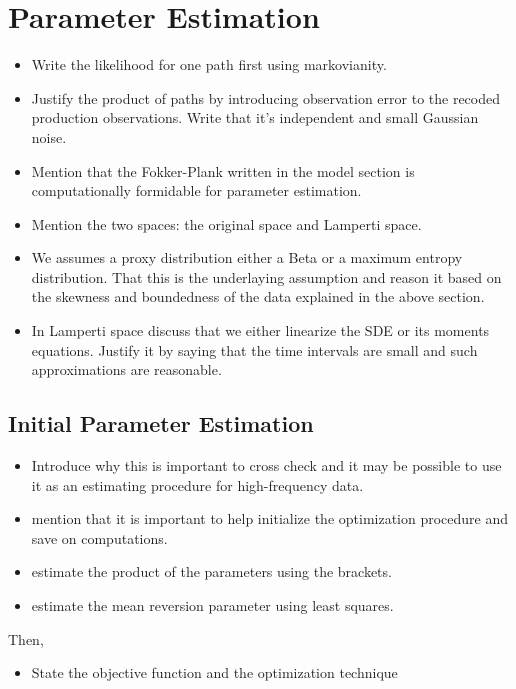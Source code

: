 \documentclass[10pt,twocolumn,letterpaper]{article}
\begin{document}
\section{Parameter Estimation}
\begin{itemize}
    \item Write the likelihood for one path first using markovianity.
    \item Justify the product of paths by introducing observation error to the recoded production observations. Write that it's independent and small Gaussian noise.
    \item Mention that the Fokker-Plank written in the model section is computationally formidable for parameter estimation.

    \item Mention the two spaces: the original space and Lamperti space.

    \item We assumes a proxy distribution either a Beta or a maximum entropy distribution. That this is the underlaying assumption and reason it based on the skewness and boundedness of the data explained in the above section.
    \item In Lamperti space discuss that we either linearize the SDE or its moments equations. Justify it by saying that the time intervals are small and such approximations are reasonable.
\end{itemize}

\subsection{Initial Parameter Estimation}

\begin{itemize}
    \item Introduce why this is important to cross check and it may be possible to use it as an estimating procedure for high-frequency data.
    \item mention that it is important to help initialize the optimization procedure and save on computations.
    \item estimate the product of the parameters using the brackets.
    \item estimate the mean reversion parameter using least squares.
\end{itemize}


Then,

\begin{itemize}
    \item State the objective function and the optimization technique
\end{itemize}
\end{document}
